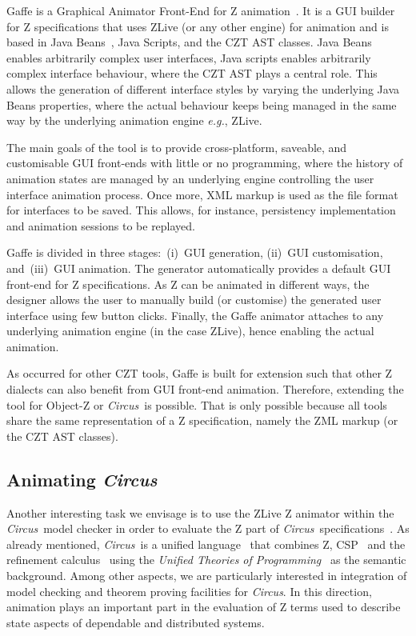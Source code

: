 \documentclass{llncs}
\newcommand{\Circus}{{\sf\slshape Circus}}
\begin{document}
    Gaffe is a Graphical Animator Front-End for Z animation~\cite{daley2003}.
    It is a GUI builder for Z specifications that uses ZLive (or any other engine)
    for animation and is based in Java Beans~\cite{javabeans}, Java Scripts, and the CZT AST classes.
    Java Beans enables arbitrarily complex user interfaces, Java scripts enables
    arbitrarily complex interface behaviour, where the CZT AST plays a central role.
    This allows the generation of different interface styles by varying the underlying
    Java Beans properties, where the actual behaviour keeps being managed in the same way
    by the underlying animation engine \textit{e.g.}, ZLive.

    The main goals of the tool is to provide cross-platform, saveable, and
    customisable GUI front-ends with little or no programming, where the
    history of animation states are managed by an underlying engine controlling the
    user interface animation process.
    Once more, XML markup is used as the file format for interfaces to be saved.
    This allows, for instance, persistency implementation and animation sessions
    to be replayed.

    Gaffe is divided in three stages:~(i)~GUI generation, (ii)~GUI customisation,
    and~(iii)~GUI animation. The generator automatically provides a default GUI front-end
    for Z specifications. As Z can be animated in different ways, the designer allows the
    user to manually build (or customise) the generated user interface using few button clicks.
    Finally, the Gaffe animator attaches to any underlying animation engine (in the case ZLive),
    hence enabling the actual animation.

    As occurred for other CZT tools, Gaffe is built for extension such that other Z dialects
    can also benefit from GUI front-end animation. Therefore, extending the tool for Object-Z
    or \Circus\ is possible. That is only possible because all tools share the same
    representation of a Z specification, namely the ZML markup (or the CZT AST classes).

\subsection{Animating \Circus}

    Another interesting task we envisage is to use the ZLive Z animator within the \Circus\ model checker
    in order to evaluate the Z part of \Circus\ specifications~\cite{circus.mc:leo}.
    As already mentioned, \Circus\ is a unified language~\cite{circus.sem:intro} that combines Z,
    CSP~\cite{csp.books:roscoe} and the refinement calculus~\cite{fm.ref:morgan}
    using the \textit{Unified Theories of Programming}~\cite{hoare.utp} as the semantic background.
    Among other aspects, we are particularly interested in integration of model checking and
    theorem proving facilities for \Circus. In this direction, animation plays an important part
    in the evaluation of Z terms used to describe state aspects of dependable and distributed systems.
\end{document}
